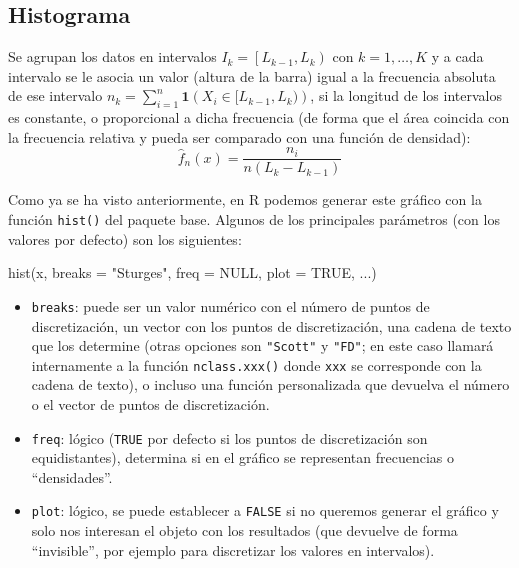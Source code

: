 \documentclass[
]{book}
\newenvironment{Shaded}{\begin{snugshade}}{\end{snugshade}}
\newcommand{\AttributeTok}[1]{\textcolor[rgb]{0.77,0.63,0.00}{#1}}
\newcommand{\ConstantTok}[1]{\textcolor[rgb]{0.00,0.00,0.00}{#1}}
\newcommand{\FunctionTok}[1]{\textcolor[rgb]{0.00,0.00,0.00}{#1}}
\newcommand{\NormalTok}[1]{#1}
\newcommand{\StringTok}[1]{\textcolor[rgb]{0.31,0.60,0.02}{#1}}
\theoremstyle{break}
\theoremstyle{definition}
\theoremstyle{definition}
\theoremstyle{definition}
\theoremstyle{definition}
\theoremstyle{remark}
\begin{document}
\hypertarget{histograma}{%
\subsection{Histograma}\label{histograma}}

Se agrupan los datos en intervalos \(I_{k}=\left[ L_{k-1},L_{k}\right)\) con \(k=1, \ldots, K\) y a cada intervalo se le asocia un valor (altura de la barra) igual a la frecuencia absoluta de ese intervalo \(n_k = \sum_{i=1}^{n}\mathbf{1}\left( X_i \in [L_{k-1},L_{k}) \right)\), si la longitud de los intervalos es constante, o proporcional a dicha frecuencia (de forma que el área coincida con la frecuencia relativa y pueda ser comparado con una función de densidad):
\[\hat{f}_n(x)=\frac{n_{i}}{n\left(  L_{k}-L_{k-1}\right)}\]

Como ya se ha visto anteriormente, en R podemos generar este gráfico con la función \texttt{hist()} del paquete base.
Algunos de los principales parámetros (con los valores por defecto) son los siguientes:

\begin{Shaded}
\begin{Highlighting}[]
\FunctionTok{hist}\NormalTok{(x, }\AttributeTok{breaks =} \StringTok{"Sturges"}\NormalTok{, }\AttributeTok{freq =} \ConstantTok{NULL}\NormalTok{, }\AttributeTok{plot =} \ConstantTok{TRUE}\NormalTok{, ...)}
\end{Highlighting}
\end{Shaded}

\begin{itemize}
\item
  \texttt{breaks}: puede ser un valor numérico con el número de puntos de discretización, un vector con los puntos de discretización, una cadena de texto que los determine (otras opciones son \texttt{"Scott"} y \texttt{"FD"}; en este caso llamará internamente a la función \texttt{nclass.xxx()} donde \texttt{xxx} se corresponde con la cadena de texto), o incluso una función personalizada que devuelva el número o el vector de puntos de discretización.
\item
  \texttt{freq}: lógico (\texttt{TRUE} por defecto si los puntos de discretización son equidistantes), determina si en el gráfico se representan frecuencias o ``densidades''.
\item
  \texttt{plot}: lógico, se puede establecer a \texttt{FALSE} si no queremos generar el gráfico y solo nos interesan el objeto con los resultados (que devuelve de forma ``invisible'', por ejemplo para discretizar los valores en intervalos).
\end{itemize}
\end{document}
